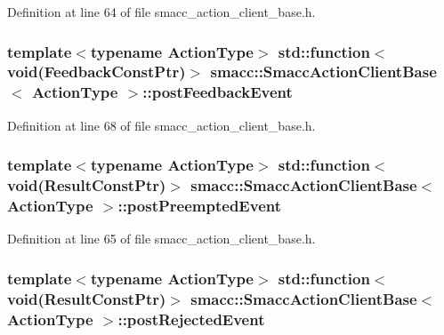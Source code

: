 Definition at line 64 of file smacc\+\_\+action\+\_\+client\+\_\+base.\+h.

\subsubsection[{\texorpdfstring{post\+Feedback\+Event}{postFeedbackEvent}}]{\setlength{\rightskip}{0pt plus 5cm}template$<$typename Action\+Type$>$ std\+::function$<$void(Feedback\+Const\+Ptr)$>$ {\bf smacc\+::\+Smacc\+Action\+Client\+Base}$<$ Action\+Type $>$\+::post\+Feedback\+Event}\hypertarget{classsmacc_1_1SmaccActionClientBase_a00b28b8a2ea8bddbbbf3e0a1d80b20a1}{}\label{classsmacc_1_1SmaccActionClientBase_a00b28b8a2ea8bddbbbf3e0a1d80b20a1}


Definition at line 68 of file smacc\+\_\+action\+\_\+client\+\_\+base.\+h.

\subsubsection[{\texorpdfstring{post\+Preempted\+Event}{postPreemptedEvent}}]{\setlength{\rightskip}{0pt plus 5cm}template$<$typename Action\+Type$>$ std\+::function$<$void(Result\+Const\+Ptr)$>$ {\bf smacc\+::\+Smacc\+Action\+Client\+Base}$<$ Action\+Type $>$\+::post\+Preempted\+Event}\hypertarget{classsmacc_1_1SmaccActionClientBase_ab573e9d9fecf76e8154fc170615e88cb}{}\label{classsmacc_1_1SmaccActionClientBase_ab573e9d9fecf76e8154fc170615e88cb}


Definition at line 65 of file smacc\+\_\+action\+\_\+client\+\_\+base.\+h.

\subsubsection[{\texorpdfstring{post\+Rejected\+Event}{postRejectedEvent}}]{\setlength{\rightskip}{0pt plus 5cm}template$<$typename Action\+Type$>$ std\+::function$<$void(Result\+Const\+Ptr)$>$ {\bf smacc\+::\+Smacc\+Action\+Client\+Base}$<$ Action\+Type $>$\+::post\+Rejected\+Event}\hypertarget{classsmacc_1_1SmaccActionClientBase_ac6e3851af2c76823d41219efbf2df480}{}\label{classsmacc_1_1SmaccActionClientBase_ac6e3851af2c76823d41219efbf2df480}


